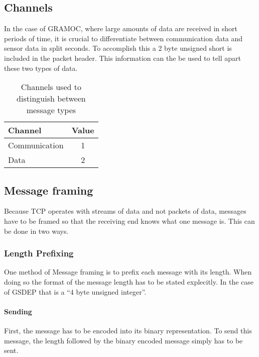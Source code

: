 \subsection{Channels}
\label{sec:channels}

In the case of GRAMOC, where large amounts of data are received in short periods of time, it is crucial to differentiate between communication data and sensor data in split seconds. To accomplish this a 2 byte unsigned short is included in the packet header. This information can the be used to tell apart these two types of data.

\begin{table}[H]
	\centering
	\begin{tabular}{| l | c |}
	\hline
	\textbf{Channel} & \textbf{Value} \\ \hline
	Communication & 1 \\ \hline
	Data & 2 \\
	\hline
	\end{tabular}
	\caption{Channels used to distinguish between message types}
	\label{tab:channels}
\end{table}

\subsection{Message framing}
\label{sec:messageframing}
Because TCP operates with streams of data and not packets of data, messages have to be framed so that the receiving end knows what one message is. This can be done in two ways. \cite{MessageFramingCleary,MessageFramingSkotzko}

\subsubsection{Length Prefixing}

One method of Message framing is to prefix each message with its length. When doing so the format of the message length has to be stated explecitly. In the case of GSDEP that is a ``4 byte unsigned integer''.

\paragraph{Sending}

First, the message has to be encoded into its binary representation. To send this message, the length followed by the binary encoded message simply has to be sent.

